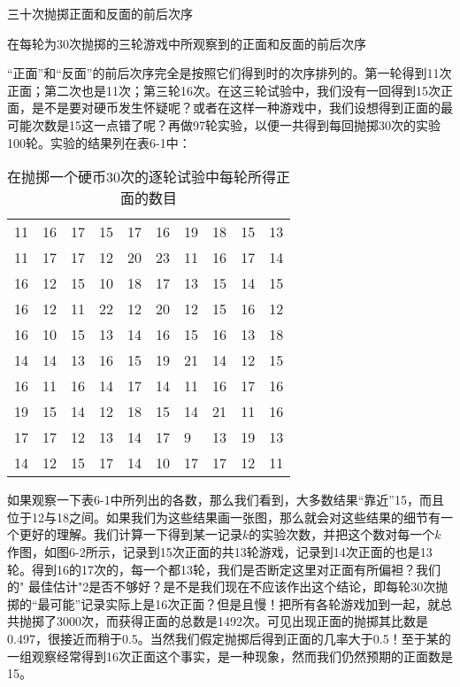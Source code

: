 \documentclass[12pt,oneside]{book}
\begin{document}
\begin{fig}{三十次抛掷正面和反面的前后次序}
\caption{\footnotesize 在每轮为30次抛掷的三轮游戏中所观察到的正面和反面的前后次序}
\label{fig:三十次抛掷正面和反面的前后次序}
\end{fig}
“正面”和“反面”的前后次序完全是按照它们得到时的次序排列的。第一轮得到11次正面；第二次也是11次；第三轮16次。在这三轮试验中，我们没有一回得到15次正面，是不是要对硬币发生怀疑呢？或者在这样一种游戏中，我们设想得到正面的最可能次数是15这一点错了呢？再做97轮实验，以便一共得到每回抛掷30次的实验100轮。实验的结果列在表6-1中：
\begin{table}[H]
\caption{\footnotesize 在抛掷一个硬币30次的逐轮试验中每轮所得正面的数目}
\centering
\medskip 
\begin{tabular}{p{20pt} p{20pt} p{20pt} p{20pt} p{20pt} p{20pt} p{20pt} p{20pt} p{20pt} p{20pt}}
\toprule
11 & 16 & 17 & 15 & 17 & 16 & 19 & 18 & 15 & 13     \\
11 & 17 & 17 & 12 & 20 & 23 & 11 & 16 & 17 & 14       \\
16 & 12 & 15 & 10 & 18 & 17 & 13 & 15 & 14 & 15     \\
16 & 12 & 11 & 22 & 12 & 20 & 12 & 15 & 16 & 12       \\
16 & 10 & 15 & 13 & 14 & 16 & 15 & 16 & 13 & 18       \\
14 & 14 & 13 & 16 & 15 & 19 & 21 & 14 & 12 & 15      \\
16 & 11 & 16 & 14 & 17 & 14 & 11 & 16 & 17 & 16      \\
19 & 15 & 14 & 12 & 18 & 15 & 14 & 21 & 11 & 16      \\
17 & 17 & 12 & 13 & 14 & 17 & 9  & 13 & 19 & 13    \\
14 & 12 & 15 & 17 & 14 & 10 & 17 & 17 & 12 & 11      \\    
\bottomrule        
\end{tabular}
\end{table}

如果观察一下表6-1中所列出的各数，那么我们看到，大多数结果“靠近”15，而且位于12与18之间。如果我们为这些结果画一张图，那么就会对这些结果的细节有一个更好的理解。我们计算一下得到某一记录$k$的实验次数，并把这个数对每一个$k$作图，如图6-2所示，记录到15次正面的共13轮游戏，记录到14次正面的也是13轮。得到16的17次的，每一个都13轮，我们是否断定这里对正面有所偏袒？我们的" 最佳估计"2是否不够好？是不是我们现在不应该作出这个结论，即每轮30次抛掷的“最可能”记录实际上是16次正面？但是且慢！把所有各轮游戏加到一起，就总共抛掷了3000次，而获得正面的总数是1492次。可见出现正面的抛掷其比数是0.497，很接近而稍于0.5。当然我们假定抛掷后得到正面的几率大于0.5！至于某的一组观察经常得到16次正面这个事实，是一种现象，然而我们仍然预期的正面数是15。
\end{document}
